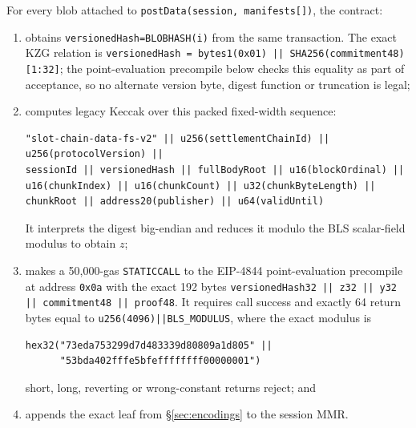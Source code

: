 \documentclass[a4paper,11pt]{article}
\newcommand{\code}[1]{\nolinkurl{#1}}
\begin{document}
For every blob attached to \code{postData(session, manifests[])}, the contract:

\begin{enumerate}
\item obtains \code{versionedHash=BLOBHASH(i)} from the same transaction.  The
exact KZG relation is
\code{versionedHash = bytes1(0x01) || SHA256(commitment48)[1:32]}; the
point-evaluation precompile below checks this equality as part of acceptance,
so no alternate version byte, digest function or truncation is legal;
\item computes legacy Keccak over this packed fixed-width sequence:
\begin{verbatim}
"slot-chain-data-fs-v2" || u256(settlementChainId) ||
u256(protocolVersion) ||
sessionId || versionedHash || fullBodyRoot || u16(blockOrdinal) ||
u16(chunkIndex) || u16(chunkCount) || u32(chunkByteLength) ||
chunkRoot || address20(publisher) || u64(validUntil)
\end{verbatim}
It interprets the digest big-endian and reduces it
modulo the BLS scalar-field modulus to obtain $z$;
\item makes a 50,000-gas \code{STATICCALL} to the EIP-4844 point-evaluation
precompile at address \code{0x0a} with the exact 192 bytes
\code{versionedHash32 || z32 || y32 || commitment48 || proof48}.  It requires
call success and exactly 64 return bytes equal to
\code{u256(4096)||BLS\_MODULUS}, where the exact modulus is
\begin{verbatim}
hex32("73eda753299d7d483339d80809a1d805" ||
      "53bda402fffe5bfeffffffff00000001")
\end{verbatim}
short, long, reverting or wrong-constant returns reject; and
\item appends the exact leaf from \S\ref{sec:encodings} to the session MMR.
\end{enumerate}
\end{document}
